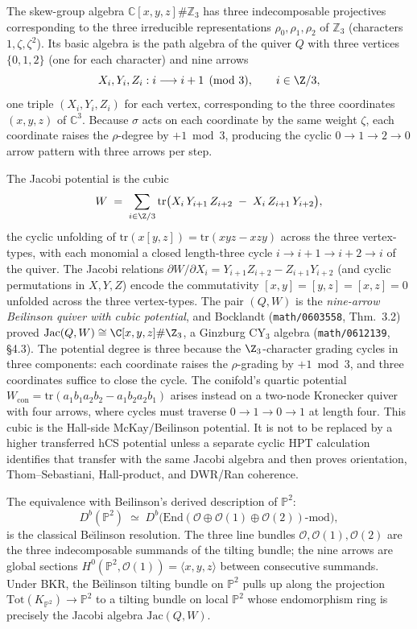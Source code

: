 The skew-group algebra $\mathbb{C}[x,y,z] \# \mathbb{Z}_3$ has three indecomposable projectives corresponding to the three irreducible representations $\rho_0, \rho_1, \rho_2$ of $\mathbb{Z}_3$ (characters $1, \zeta, \zeta^2$). Its basic algebra is the path algebra of the quiver $Q$ with three vertices $\{0, 1, 2\}$ (one for each character) and nine arrows
\[
X_i, Y_i, Z_i : i \longrightarrow i + 1 \pmod 3, \qquad i \in \Z/3,
\]
one triple $(X_i, Y_i, Z_i)$ for each vertex, corresponding to the three coordinates $(x, y, z)$ of $\mathbb{C}^3$. Because $\sigma$ acts on each coordinate by the same weight $\zeta$, each coordinate raises the $\rho$-degree by $+1 \bmod 3$, producing the cyclic $0 \to 1 \to 2 \to 0$ arrow pattern with three arrows per step.

The Jacobi potential is the cubic
\[
W \;=\; \sum_{i \in \Z/3} \mathrm{tr}\bigl(X_i \, Y_{i+1} \, Z_{i+2} \;-\; X_i \, Z_{i+1} \, Y_{i+2}\bigr),
\]
the cyclic unfolding of $\mathrm{tr}(x[y,z]) = \mathrm{tr}(xyz - xzy)$ across the three vertex-types, with each monomial a closed length-three cycle $i \to i+1 \to i+2 \to i$ of the quiver. The Jacobi relations $\partial W/\partial X_i = Y_{i+1} Z_{i+2} - Z_{i+1} Y_{i+2}$ (and cyclic permutations in $X, Y, Z$) encode the commutativity $[x, y] = [y, z] = [x, z] = 0$ unfolded across the three vertex-types. The pair $(Q, W)$ is the \emph{nine-arrow Beilinson quiver with cubic potential}, and Bocklandt (\texttt{math/0603558}, Thm.~3.2) proved $\mathrm{Jac}(Q, W) \cong \C[x,y,z] \# \Z_3$, a Ginzburg CY$_3$ algebra (\texttt{math/0612139}, \S 4.3). The potential degree is three because the $\Z_3$-character grading cycles in three components: each coordinate raises the $\rho$-grading by $+1 \bmod 3$, and three coordinates suffice to close the cycle. The conifold's quartic potential $W_{\mathrm{con}} = \mathrm{tr}(a_1 b_1 a_2 b_2 - a_1 b_2 a_2 b_1)$ arises instead on a two-node Kronecker quiver with four arrows, where cycles must traverse $0 \to 1 \to 0 \to 1$ at length four.
This cubic is the Hall-side McKay/Beilinson potential. It is not to be
replaced by a higher transferred hCS potential unless a separate cyclic
HPT calculation identifies that transfer with the same Jacobi algebra and
then proves orientation, Thom--Sebastiani, Hall-product, and DWR/Ran
coherence.

The equivalence with Beilinson's derived description of $\mathbb{P}^2$:
\[
D^b(\mathbb{P}^2) \;\simeq\; D^b\bigl(\mathrm{End}(\mathcal{O} \oplus \mathcal{O}(1) \oplus \mathcal{O}(2))\text{-mod}\bigr),
\]
is the classical Be\u{\i}linson resolution. The three line bundles $\mathcal{O}, \mathcal{O}(1), \mathcal{O}(2)$ are the three indecomposable summands of the tilting bundle; the nine arrows are global sections $H^0(\mathbb{P}^2, \mathcal{O}(1)) = \langle x, y, z\rangle$ between consecutive summands. Under BKR, the Be\u{\i}linson tilting bundle on $\mathbb{P}^2$ pulls up along the projection $\mathrm{Tot}(K_{\mathbb{P}^2}) \to \mathbb{P}^2$ to a tilting bundle on local $\mathbb{P}^2$ whose endomorphism ring is precisely the Jacobi algebra $\mathrm{Jac}(Q, W)$.


